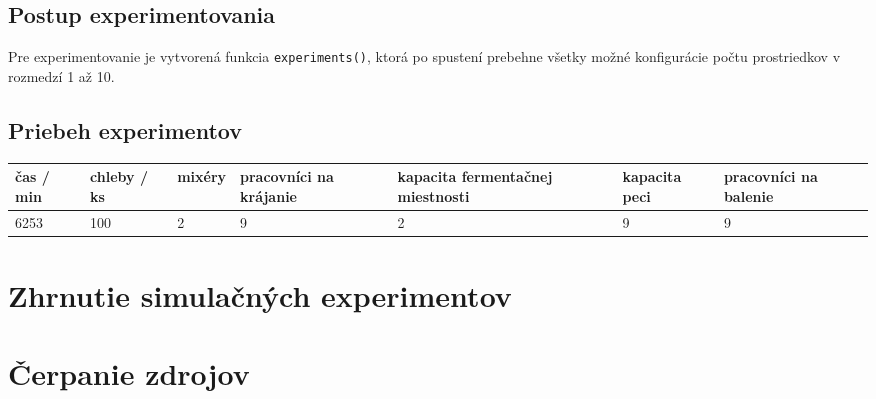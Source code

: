 \documentclass[a4paper, 10pt]{article}
\begin{document}
    \subsection{Postup experimentovania}
        Pre experimentovanie je vytvorená funkcia \texttt{experiments()}, ktorá po spustení prebehne všetky možné
        konfigurácie počtu prostriedkov v rozmedzí 1 až 10.

    \subsection{Priebeh experimentov}

    \begin{center}
        \begin{tabular}{ |p{2cm}|p{2cm}|p{2cm}|p{2cm}|p{2cm}|p{2cm}|p{2cm}| }
            \hline
            čas / min & chleby / ks & mixéry & pracovníci na krájanie & kapacita fermentačnej miestnosti & kapacita peci & pracovníci na balenie\\
            \hline\hline
            6253 & 100 & 2 & 9 & 2 & 9 & 9\\
            \hline
        \end{tabular}
    \end{center}

    \section{Zhrnutie simulačných experimentov}

    \section {Čerpanie zdrojov}

    \newpage
    
    
\end{document}
